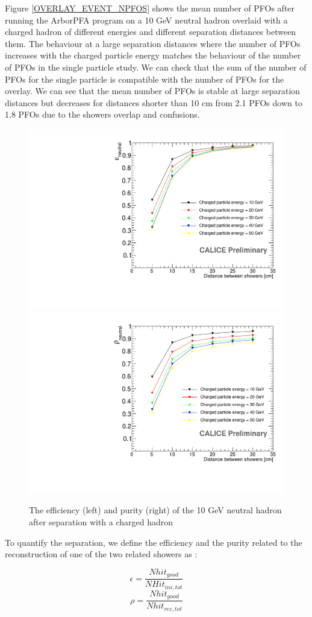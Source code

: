 \documentclass[cits]{JINST}
\begin{document}
Figure \ref{OVERLAY_EVENT_NPFOS} shows the mean number of PFOs after running the ArborPFA program on a 10 GeV neutral hadron overlaid with a charged hadron of different energies and different separation distances between them. The behaviour at a large separation distances where the number of PFOs increases with the charged particle energy matches the behaviour of the number of PFOs in the single particle study. We can check that the sum of the number of PFOs for the single particle is compatible with the number of PFOs for the overlay. We can see that the mean number of PFOs is stable at large separation distances but decreases for distances shorter than 10 cm from 2.1 PFOs down to 1.8 PFOs due to the showers overlap and confusions.

\begin{figure}[!h]
  \begin{center}
    \includegraphics[width=0.47\linewidth]{plots/OverlayEvent_NeutralEfficiency.pdf}
    \includegraphics[width=0.47\linewidth]{plots/OverlayEvent_NeutralPurity.pdf}
  \end{center}
  \caption{\label{OVERLAY_EVENT_PURITY_EFFICIENCY} The efficiency (left) and purity (right) of the 10 GeV neutral hadron after separation with a charged hadron}
\end{figure}


To quantify the separation, we define the efficiency and the purity related to the reconstruction of one of the two related showers as :

\begin{equation}
  \epsilon = \frac{Nhit_{good}}{NHit_{ini,tot}}
\end{equation}
\begin{equation}
  \rho = \frac{Nhit_{good}}{Nhit_{rec,tot}}
\end{equation}
\end{document}
